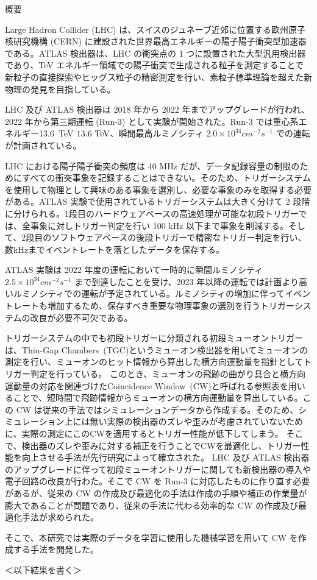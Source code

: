 \begin{center}
  \begin{huge}
    概要
  \end{huge}
\end{center}

\vspace{10pt}

Large Hadron Collider (LHC) は、スイスのジュネーブ近郊に位置する欧州原子核研究機構 (CERN) に建設された世界最高エネルギーの陽子陽子衝突型加速器である。ATLAS 検出器は、LHC の衝突点の 1 つに設置された大型汎用検出器であり、TeV エネルギー領域での陽子衝突で生成される粒子を測定することで新粒子の直接探索やヒッグス粒子の精密測定を行い、素粒子標準理論を超えた新物理の発見を目指している。

LHC 及び ATLAS 検出器は 2018 年から 2022 年までアップグレードが行われ、2022 年から第三期運転 (Run-3) として実験が開始された。Run-3 では重心系エネルギー13.6~TeV $13.6~{\rm TeV}$、瞬間最高ルミノシティ $2.0\times10^{34} cm^{−2}s^{−1}$ での運転が計画されている。

LHC における陽子陽子衝突の頻度は 40 MHz だが、データ記録容量の制限のためにすべての衝突事象を記録することはできない。そのため、トリガーシステムを使用して物理として興味のある事象を選別し、必要な事象のみを取得する必要がある。ATLAS 実験で使用されているトリガーシステムは大きく分けて 2 段階に分けられる。1段目のハードウェアベースの高速処理が可能な初段トリガーでは、全事象に対しトリガー判定を行い 100 kHz 以下まで事象を削減する。そして、2段目のソフトウェアベースの後段トリガーで精密なトリガー判定を行い、数kHzまでイベントレートを落としたデータを保存する。

ATLAS 実験は 2022 年度の運転において一時的に瞬間ルミノシティ $2.5\times10^{34} cm^{−2}s^{−1}$ まで到達したことを受け、2023 年以降の運転では計画より高いルミノシティでの運転が予定されている。ルミノシティの増加に伴ってイベントレートも増加するため、保存すべき重要な物理事象の選別を行うトリガーシステムの改良が必要不可欠である。

トリガーシステムの中でも初段トリガーに分類される初段ミューオントリガーは、Thin-Gap Chambers~(TGC)というミューオン検出器を用いてミューオンの測定を行い、ミューオンのヒット情報から算出した横方向運動量を指針としてトリガー判定を行っている。
このとき、ミューオンの飛跡の曲がり具合と横方向運動量の対応を関連づけたCoincidence Window~(CW)と呼ばれる参照表を用いることで、短時間で飛跡情報からミューオンの横方向運動量を算出している。この CW は従来の手法ではシミュレーションデータから作成する。そのため、シミュレーション上には無い実際の検出器のズレや歪みが考慮されていないために、実際の測定にこのCWを適用するとトリガー性能が低下してしまう。
そこで、検出器のズレや歪みに対する補正を行うことでCWを最適化し、トリガー性能を向上させる手法が先行研究によって確立された。
LHC 及び ATLAS 検出器のアップグレードに伴って初段ミューオントリガーに関しても新検出器の導入や電子回路の改良が行わた。そこで CW を Run-3 に対応したものに作り直す必要があるが、従来の CW の作成及び最適化の手法は作成の手順や補正の作業量が膨大であることが問題であり、従来の手法に代わる効率的な CW の作成及び最適化手法が求められた。

そこで、本研究では実際のデータを学習に使用した機械学習を用いて CW を作成する手法を開発した。

＜以下結果を書く＞

